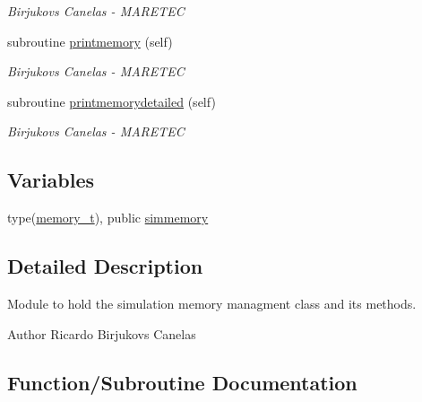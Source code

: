 \begin{DoxyCompactItemize}
\begin{DoxyCompactList}\small\item\em Birjukovs Canelas -\/ M\+A\+R\+E\+T\+EC \end{DoxyCompactList}\item 
subroutine \hyperlink{namespacesimulation__memory__mod_a16a7a1c7e88fe5a5523d23f83f0e04a0}{printmemory} (self)
\begin{DoxyCompactList}\small\item\em Birjukovs Canelas -\/ M\+A\+R\+E\+T\+EC \end{DoxyCompactList}\item 
subroutine \hyperlink{namespacesimulation__memory__mod_a894bd4ec7462fd634d328ee5be4c6483}{printmemorydetailed} (self)
\begin{DoxyCompactList}\small\item\em Birjukovs Canelas -\/ M\+A\+R\+E\+T\+EC \end{DoxyCompactList}\end{DoxyCompactItemize}
\subsection*{Variables}
\begin{DoxyCompactItemize}
\item 
type(\hyperlink{structsimulation__memory__mod_1_1memory__t}{memory\+\_\+t}), public \hyperlink{namespacesimulation__memory__mod_af3e2714796469b4b1ec247569b184088}{simmemory}
\end{DoxyCompactItemize}


\subsection{Detailed Description}
Module to hold the simulation memory managment class and its methods. 

\begin{DoxyAuthor}{Author}
Ricardo Birjukovs Canelas 
\end{DoxyAuthor}


\subsection{Function/\+Subroutine Documentation}
\mbox{\label{namespacesimulation__memory__mod_a4169689db37b3ba35e092096a7019f80}} 
